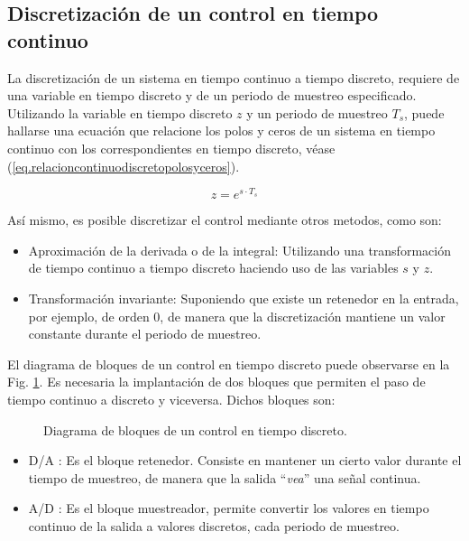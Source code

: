 \documentclass{report}
\begin{document}
\subsection{Discretización de un control en tiempo continuo}

La discretización de un sistema en tiempo continuo a tiempo discreto, requiere de una variable en tiempo discreto y de un periodo de muestreo especificado. Utilizando la variable en tiempo discreto $z$ y un periodo de muestreo $T_{s}$, puede hallarse una ecuación que relacione los polos y ceros de un sistema en tiempo continuo con los correspondientes en tiempo discreto, véase  (\ref{eq.relacioncontinuodiscretopolosyceros}).

\begin{equation}
z = e^{s \cdot T_{s}} \label{eq.relacioncontinuodiscretopolosyceros}
\end{equation}

Así mismo, es posible discretizar el control mediante otros metodos, como son:
\begin{itemize}
    \item Aproximación de la derivada o de la integral: Utilizando una transformación de tiempo continuo a tiempo discreto haciendo uso de las variables $s$ y $z$.
    \item Transformación invariante: Suponiendo que existe un retenedor en la entrada, por ejemplo, de orden 0, de manera que la discretización mantiene un valor constante durante el periodo de muestreo.
\end{itemize}

El diagrama de bloques de un control en tiempo discreto puede observarse en la Fig. \ref{fig.DiagramadebloquesControldiscreto}. Es necesaria la implantación de dos bloques que permiten el paso de tiempo continuo a discreto y viceversa. Dichos bloques son:

\begin{figure}[!h]
    \begin{center}
    \caption{Diagrama de bloques de un control en tiempo discreto.}
    \label{fig.DiagramadebloquesControldiscreto} 
    \end{center}
\end{figure}

\begin{itemize}
    \item D/A : Es el bloque retenedor. Consiste en mantener un cierto valor durante el tiempo de muestreo, de manera que la salida ``\textit{vea}'' una señal continua.
    \item A/D : Es el bloque muestreador, permite convertir los valores en tiempo continuo de la salida a valores discretos, cada periodo de muestreo.
\end{itemize}
\end{document}
